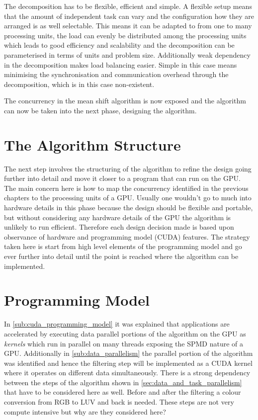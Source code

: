 The decomposition has to be flexible, efficient and simple. A flexible setup
means that the amount of independent task can vary and the configuration how
they are arranged is as well selectable. This means it can be adapted to from
one to many processing units, the load can evenly be distributed among the
processing units which leads to good efficiency and scalability and the
decomposition can be parameterised in terms of units and problem size.
Additionally weak dependency in the decomposition makes load balancing easier.
Simple in this case means minimising the synchronisation and communication overhead
through the decomposition, which is in this case non-existent. 

The concurrency in the mean shift algorithm is now exposed and the algorithm can
now be taken into the next phase, designing the algorithm.

\section{The Algorithm Structure} %
\label{sec:introduction_design}

The next step involves the structuring of the algorithm to refine the design
going further into detail and move it closer to a program that can run on the
\gls{GPU}. The main concern here is how to map the concurrency identified in the
previous chapters to the processing units of a \gls{GPU}. Usually one wouldn't
go to much into hardware details in this phase because the design should be
flexible and portable, but without considering any hardware details of the
\gls{GPU} the algorithm is unlikely to run efficient. Therefore each design
decision made is based upon observance of hardware and programming model
(\gls{CUDA}) features. The strategy taken here is start from high level elements
of the programming model and go ever further into detail until the point is reached
where the algorithm can be implemented. 

\section{Programming Model} %
\label{sec:cuda_kernels}

In \autoref{sub:cuda_programming_model} it was explained that applications are
accelerated by executing data parallel portions of the algorithm on the
\gls{GPU} as \emph{kernels} which run in parallel on many threads exposing the
\gls{SPMD} nature of a \gls{GPU}. Additionally in \autoref{sub:data_parallelism}
the parallel portion of the algorithm was identified and hence the filtering
step will be implemented as a \gls{CUDA} kernel where it operates on different
data simultaneously. There is a strong dependency between the steps of the 
algorithm shown in \autoref{sec:data_and_task_parallelism} that have to be 
considered here as well. Before and after the filtering a colour conversion from
\gls{RGB} to \gls{LUV} and back is needed. These steps are not very compute 
intensive but why are they considered here?

